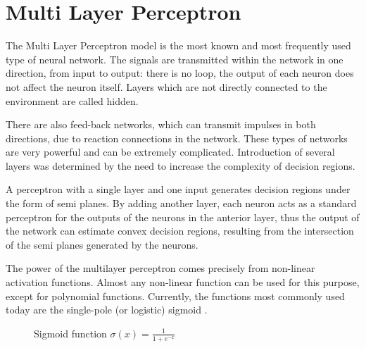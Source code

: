 \section{Multi Layer Perceptron}
The Multi Layer Perceptron model is the most known and
most frequently used type of neural network. The signals are transmitted within the
network in one direction, from input to output: there
is no loop, the output of each neuron does not affect
the neuron itself.
Layers which are not directly connected to the
environment are called hidden.

There are also
feed-back networks, which can transmit impulses in
both directions, due to reaction connections in the
network. These types of networks are very powerful
and can be extremely complicated.
Introduction of several layers was
determined by the need to increase the complexity of
decision regions.

A perceptron with a single layer and one
input generates decision regions under the form of
semi planes. By adding another layer, each neuron
acts as a standard perceptron for the outputs of the
neurons in the anterior layer, thus the output of the
network can estimate convex decision regions,
resulting from the intersection of the semi planes
generated by the neurons.

The power of the multilayer perceptron comes
precisely from non-linear activation functions.
Almost any non-linear function can be used for this
purpose, except for polynomial functions. Currently,
the functions most commonly used today are the
single-pole (or logistic) sigmoid \cite{mlp}.

\begin{figure}[H]
	\centering
	\caption{Sigmoid function $\sigma(x) = \frac{1}{1+e^{-x}}$}
	\label{fig:sigmoid}
\end{figure}

